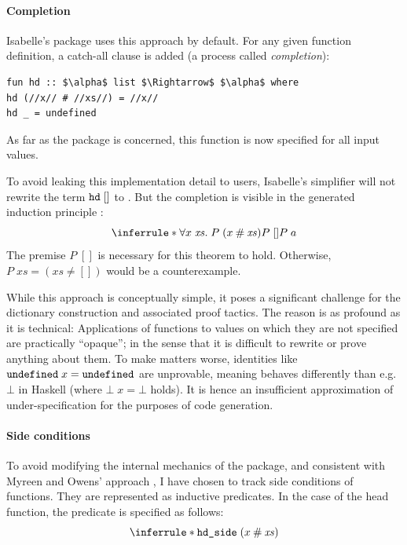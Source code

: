\paragraph{Completion}
Isabelle's  package uses this approach by default.
For any given function definition, a catch-all clause is added (a process called \emph{completion}):
%
\begin{lstlisting}[language=Isabelle]
fun hd :: $\alpha$ list $\Rightarrow$ $\alpha$ where
hd (//x// # //xs//) = //x//
hd _ = undefined
\end{lstlisting}
%
As far as the  package is concerned, this function is now specified for all input values.

To avoid leaking this implementation detail to users, Isabelle's simplifier will not rewrite the term $\texttt{\textup{hd}}\;[]$ to .
But the completion is visible in the generated induction principle :
\[
  \inferrule*{
    \forall x\;\mathit{xs}.\;P\;(x \cons \mathit{xs}) \\
    P \; []
  }{P\;a}
\]
The premise $P\;[]$ is necessary for this theorem to hold.
Otherwise, $P\;\mathit{xs} = (\mathit{xs} \neq [])$ would be a counterexample.

While this approach is conceptually simple, it poses a significant challenge for the dictionary construction and associated proof tactics.
The reason is as profound as it is technical:
Applications of functions to values on which they are not specified are practically ``opaque''; in the sense that it is difficult to rewrite or prove anything about them.
To make matters worse, identities like $\texttt{\textup{undefined}}\;x = \texttt{\textup{undefined}}$ are unprovable, meaning  behaves differently than e.g.\ $\bot$ in Haskell (where $\bot\;x = \bot$ holds).
It is hence an insufficient approximation of under-specification for the purposes of code generation.

\paragraph{Side conditions}
To avoid modifying the internal mechanics of the  package, and consistent with Myreen and Owens' approach \cite{myreen2014translation}, I have chosen to track side conditions of functions.
They are represented as inductive predicates.
In the case of the head function, the predicate is specified as follows:
\[
  \inferrule*{ }{\holconst{hd\_side}\;(x \cons \mathit{xs})}
\]

